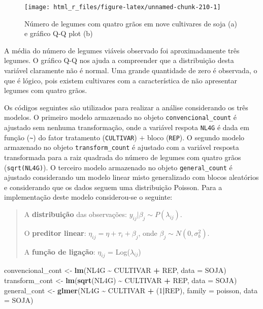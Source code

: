 \documentclass[
]{book}
\makeatletter
\newenvironment{Shaded}{\begin{snugshade}}{\end{snugshade}}
\newcommand{\DataTypeTok}[1]{\textcolor[rgb]{0.13,0.29,0.53}{#1}}
\newcommand{\DecValTok}[1]{\textcolor[rgb]{0.00,0.00,0.81}{#1}}
\newcommand{\KeywordTok}[1]{\textcolor[rgb]{0.13,0.29,0.53}{\textbf{#1}}}
\newcommand{\NormalTok}[1]{#1}
\newcommand{\OperatorTok}[1]{\textcolor[rgb]{0.81,0.36,0.00}{\textbf{#1}}}
\newcommand{\StringTok}[1]{\textcolor[rgb]{0.31,0.60,0.02}{#1}}
\numberwithin{equation}{section}
\newcommand{\indf}[1]{\index[function]{#1@\texttt{#1()}|ST}}
\makeatother
\begin{document}
\begin{figure}

{\centering \texttt{[image: html\_r\_files/figure-latex/unnamed-chunk-210-1]} 

}

\caption{Número de legumes com quatro grãos em nove cultivares de soja (a) e gráfico Q-Q plot (b)}\label{fig:unnamed-chunk-210}
\end{figure}

A média do número de legumes viáveis observado foi aproximadamente três legumes. O gráfico Q-Q nos ajuda a compreender que a distribuição desta variável claramente não é normal. Uma grande quantidade de zero é observada, o que é lógico, pois existem cultivares com a característica de não apresentar legumes com quatro grãos.

Os códigos seguintes são utilizados para realizar a análise considerando os três modelos. O primeiro modelo armazenado no objeto \texttt{convencional\_count} é ajustado sem nenhuma transformação, onde a variável respota \texttt{NL4G} é dada em função (\texttt{\textasciitilde{}}) do fator tratamento (\texttt{CULTIVAR}) \(+\) bloco (\texttt{REP}). O segundo modelo armazenado no objeto \texttt{transform\_count} é ajustado com a variável resposta transformada para a raiz quadrada do número de legumes com quatro grãos (\texttt{sqrt(NL4G)}). O terceiro modelo armazenado no objeto \texttt{general\_count} é ajustado considerando um modelo linear misto generalizado com blocos aleatórios e considerando que os dados seguem uma distribuição Poisson. Para a implementação deste modelo considerou-se o seguinte:

\begin{quote}
A \textbf{distribuição} das observações: \(y_{ij}|\beta_j \sim P(\lambda_{ij})\).

O \textbf{preditor linear}: \(\eta_{ij} = \eta + \tau_{i} + \beta_j\), onde \(\beta_j \sim N(0, \sigma^2_b)\).

A \textbf{função de ligação}: \(\eta_{ij}\) = Log(\(\lambda_{ij}\))
\end{quote}

\indf{lm} \indf{glmer}

\begin{Shaded}
\begin{Highlighting}[]
\NormalTok{convencional\_cont \textless{}{-}}\StringTok{ }\KeywordTok{lm}\NormalTok{(NL4G }\OperatorTok{\textasciitilde{}}\StringTok{ }\NormalTok{CULTIVAR }\OperatorTok{+}\StringTok{ }\NormalTok{REP, }\DataTypeTok{data =}\NormalTok{ SOJA)}
\NormalTok{transform\_cont \textless{}{-}}\StringTok{ }\KeywordTok{lm}\NormalTok{(}\KeywordTok{sqrt}\NormalTok{(NL4G) }\OperatorTok{\textasciitilde{}}\StringTok{ }\NormalTok{CULTIVAR }\OperatorTok{+}\StringTok{ }\NormalTok{REP, }\DataTypeTok{data =}\NormalTok{ SOJA)}
\NormalTok{general\_cont \textless{}{-}}\StringTok{ }\KeywordTok{glmer}\NormalTok{(NL4G }\OperatorTok{\textasciitilde{}}\StringTok{ }\NormalTok{CULTIVAR }\OperatorTok{+}\StringTok{ }\NormalTok{(}\DecValTok{1}\OperatorTok{|}\NormalTok{REP),}
                     \DataTypeTok{family =}\NormalTok{ poisson,}
                     \DataTypeTok{data =}\NormalTok{ SOJA)}
\end{Highlighting}
\end{Shaded}
\end{document}
